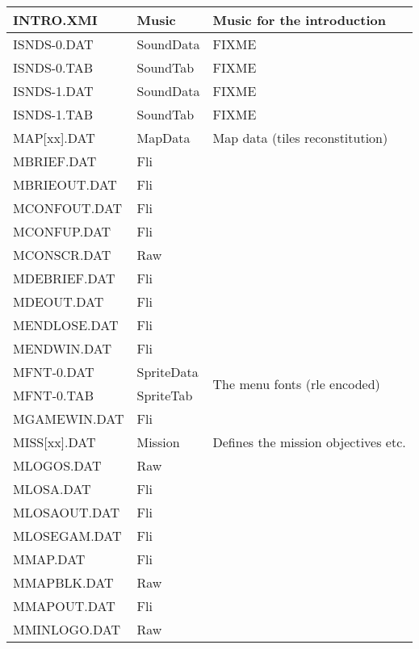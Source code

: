 \documentclass[a4paper,twoside,12pt,dvips]{article}
\begin{document}
\begin{center}
\begin{longtable}{|l|l|l|}
    \hline
    INTRO.XMI    & Music         & Music for the introduction \\
    \hline
    ISNDS-0.DAT  & SoundData     & FIXME \\
    \hline
    ISNDS-0.TAB  & SoundTab      & FIXME \\
    \hline
    ISNDS-1.DAT  & SoundData     & FIXME \\
    \hline
    ISNDS-1.TAB  & SoundTab      & FIXME \\
    \hline
    MAP[xx].DAT  & MapData       & Map data (tiles reconstitution) \\
    \hline
    MBRIEF.DAT   & Fli           & ~ \\
    \hline
    MBRIEOUT.DAT & Fli           & ~ \\
    \hline
    MCONFOUT.DAT & Fli           & ~ \\
    \hline
    MCONFUP.DAT  & Fli           & ~ \\
    \hline
    MCONSCR.DAT  & Raw           & ~ \\
    \hline
    MDEBRIEF.DAT & Fli           & ~ \\
    \hline
    MDEOUT.DAT   & Fli           & ~ \\
    \hline
    MENDLOSE.DAT & Fli           & ~ \\
    \hline
    MENDWIN.DAT  & Fli           & ~ \\
    \hline
    MFNT-0.DAT   & SpriteData    & \multirow{2}{*}{The menu fonts (rle encoded)} \\
    \cline{1-2}
    MFNT-0.TAB   & SpriteTab     & ~ \\
    \hline
    MGAMEWIN.DAT & Fli           & ~ \\
    \hline
    MISS[xx].DAT & Mission       & Defines the mission objectives etc.\\
    \hline
    MLOGOS.DAT   & Raw           & ~ \\
    \hline
    MLOSA.DAT    & Fli           & ~ \\
    \hline
    MLOSAOUT.DAT & Fli           & ~ \\
    \hline
    MLOSEGAM.DAT & Fli           & ~ \\
    \hline
    MMAP.DAT     & Fli           & ~ \\
    \hline
    MMAPBLK.DAT  & Raw           & ~ \\
    \hline
    MMAPOUT.DAT  & Fli           & ~ \\
    \hline
    MMINLOGO.DAT & Raw           & ~ \\

\end{longtable}
\end{center}
\end{document}
